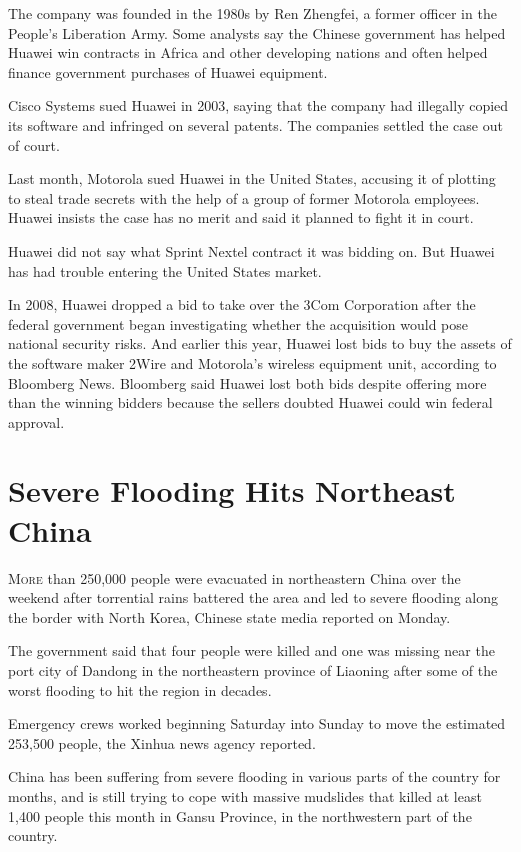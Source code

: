 ﻿\documentclass[12pt]{article}
\begin{document}
The company was founded in the 1980s by Ren Zhengfei, a former officer in the People's Liberation
Army. Some analysts say the Chinese government has helped Huawei win contracts in Africa and other
developing nations and often helped finance government purchases of Huawei equipment.

Cisco Systems sued Huawei in 2003, saying that the company had illegally copied its software and
infringed on several patents. The companies settled the case out of court.

Last month, Motorola sued Huawei in the United States, accusing it of plotting to steal trade
secrets with the help of a group of former Motorola employees. Huawei insists the case has no merit
and said it planned to fight it in court.

Huawei did not say what Sprint Nextel contract it was bidding on. But Huawei has had trouble
entering the United States market.

In 2008, Huawei dropped a bid to take over the 3Com Corporation after the federal government began
investigating whether the acquisition would pose national security risks. And earlier this year,
Huawei lost bids to buy the assets of the software maker 2Wire and Motorola's wireless equipment
unit, according to Bloomberg News. Bloomberg said Huawei lost both bids despite offering more than
the winning bidders because the sellers doubted Huawei could win federal approval.

\pagebreak
\section{Severe Flooding Hits Northeast China}

\lettrine{M}{ore} than 250,000 people were evacuated in northeastern China
over the weekend after torrential rains battered the area and led to severe flooding along the
border with North Korea, Chinese state media reported on Monday.

The government said that four people were killed and one was missing near the port city of Dandong
in the northeastern province of Liaoning after some of the worst flooding to hit the region in
decades.

Emergency crews worked beginning Saturday into Sunday to move the estimated 253,500 people, the
Xinhua news agency reported.

China has been suffering from severe flooding in various parts of the country for months, and is
still trying to cope with massive mudslides that killed at least 1,400 people this month in Gansu
Province, in the northwestern part of the country.
\end{document}
